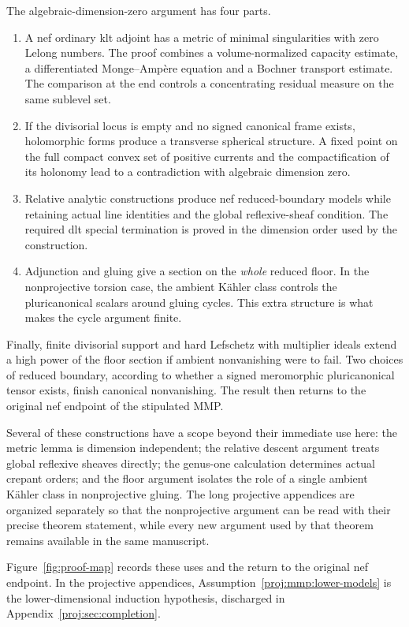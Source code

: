 The algebraic-dimension-zero argument has four parts.
\begin{enumerate}
\item A nef ordinary klt adjoint has a metric of minimal
singularities with zero Lelong numbers. The proof combines a
volume-normalized capacity estimate, a differentiated
Monge--Amp\`ere equation and a Bochner transport estimate. The
comparison at the end controls a concentrating residual measure
on the same sublevel set.
\item If the divisorial locus is empty and no signed canonical
frame exists, holomorphic forms produce a transverse spherical
structure. A fixed point on the full compact convex set of positive
currents and the compactification of its holonomy lead to a
contradiction with algebraic dimension zero.
\item Relative analytic constructions produce nef reduced-boundary
models while retaining actual line identities and the global
reflexive-sheaf condition. The required dlt special termination is
proved in the dimension order used by the construction.
\item Adjunction and gluing give a section on the \emph{whole}
reduced floor. In the nonprojective torsion case, the ambient
K\"ahler class controls the pluricanonical scalars around gluing
cycles. This extra structure is what makes the cycle argument
finite.
\end{enumerate}
Finally, finite divisorial support and hard Lefschetz with multiplier
ideals extend a high power of the floor section if ambient
nonvanishing were to fail. Two choices of reduced boundary, according
to whether a signed meromorphic pluricanonical tensor exists, finish
canonical nonvanishing. The result then returns to the original nef
endpoint of the stipulated MMP.

Several of these constructions have a scope beyond their immediate
use here: the metric lemma is dimension independent; the relative
descent argument treats global reflexive sheaves directly; the
genus-one calculation determines actual crepant orders; and the
floor argument isolates the role of a single ambient K\"ahler
class in nonprojective gluing. The long projective appendices are
organized separately so that the nonprojective argument can be read
with their precise theorem statement, while every new argument used
by that theorem remains available in the same manuscript.

Figure~\ref{fig:proof-map} records these uses and the return to the
original nef endpoint. In the projective appendices,
Assumption~\ref{proj:mmp:lower-models} is the lower-dimensional induction
hypothesis, discharged in Appendix~\ref{proj:sec:completion}.

